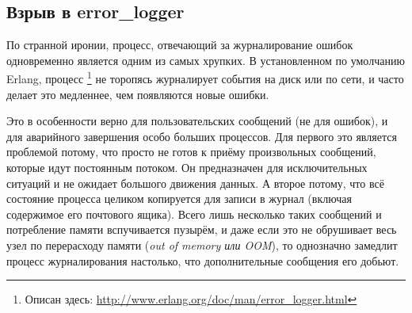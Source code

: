 \documentclass[11pt, oneside]{book}   	%
\begin{document}
\subsection{Взрыв в error\_logger}

По странной иронии, процесс, отвечающий за журналирование ошибок одновременно является одним из самых хрупких. В установленном по умолчанию Erlang, процесс \footnote{Описан здесь: \href{http://www.erlang.org/doc/man/error\_logger.html}{http://www.erlang.org/doc/man/error\_logger.html}} не торопясь журналирует события на диск или по сети, и часто делает это медленнее, чем появляются новые ошибки.

Это в особенности верно для пользовательских сообщений (не для ошибок), и для аварийного завершения особо больших процессов. Для первого это является проблемой потому, что  просто не готов к приёму произвольных сообщений, которые идут постоянным потоком. Он предназначен для исключительных ситуаций и не ожидает большого движения данных. А второе потому, что всё состояние процесса целиком копируется для записи в журнал (включая содержимое его почтового ящика). Всего лишь несколько таких сообщений и потребление памяти вспучивается пузырём, и даже если это не обрушивает весь узел по перерасходу памяти (\emph{out of memory или OOM}), то однозначно замедлит процесс журналирования настолько, что дополнительные сообщения его добьют.
\end{document}
